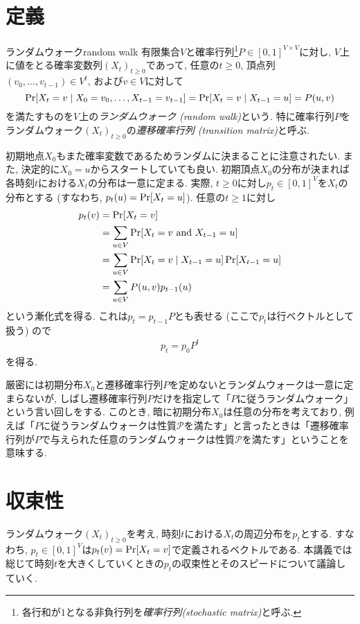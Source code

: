 \section{定義}
%
\begin{definition}{ランダムウォーク}{random walk}
  有限集合$V$と確率行列\footnote{各行和が$1$となる非負行列を\emph{確率行列(stochastic matrix)}と呼ぶ.}$P\in[0,1]^{V\times V}$に対し,
  $V$上に値をとる確率変数列$(X_t)_{t\ge 0}$であって, 任意の$t\ge 0$, 頂点列$(v_0,\dots,v_{t-1})\in V^t$,
  および$v\in V$に対して
  \[
    \Pr\sbra*{X_t = v \condition X_0 = v_0,\dots,X_{t-1} = v_{t-1}} = \Pr\sbra*{X_t = v \condition X_{t-1} = u} = P(u,v)
  \]
  を満たすものを$V$上の\emph{ランダムウォーク (random walk)}という.
  特に確率行列$P$をランダムウォーク$(X_t)_{t\ge 0}$の\emph{遷移確率行列 (transition matrix)}と呼ぶ.
\end{definition}
%
初期地点$X_0$もまた確率変数であるためランダムに決まることに注意されたい.
また, 決定的に$X_0=u$からスタートしていても良い.
%
初期頂点$X_0$の分布が決まれば各時刻$t$における$X_t$の分布は一意に定まる.
実際, $t\ge 0$に対し$p_t \in [0,1]^{V}$を$X_t$の分布とする
(すなわち, $p_t(u) = \Pr\sbra*{X_t = u}$).
任意の$t\ge 1$に対し
\begin{align*}
  p_t(v) & = \Pr\sbra*{X_t = v}                                                             \\
         & = \sum_{u\in V}\Pr\sbra*{ X_t = v \tand X_{t-1} = u}                             \\
         & = \sum_{u\in V}\Pr\sbra*{ X_t = v \condition X_{t-1} = u} \Pr\sbra*{X_{t-1} = u} \\
         & = \sum_{u\in V} P(u,v) p_{t-1}(u)
\end{align*}
という漸化式を得る.
これは$p_{t} = p_{t-1} P$とも表せる (ここで$p_t$は行ベクトルとして扱う) ので
\begin{align}
  p_t = p_0 P^t \label{eq:p_t}
\end{align}
を得る.

厳密には初期分布$X_0$と遷移確率行列$P$を定めないとランダムウォークは一意に定まらないが,
しばし遷移確率行列$P$だけを指定して「$P$に従うランダムウォーク」という言い回しをする.
このとき, 暗に初期分布$X_0$は任意の分布を考えており, 例えば「$P$に従うランダムウォークは性質$\mathcal{P}$を満たす」と言ったときは「遷移確率行列が$P$で与えられた任意のランダムウォークは性質$\mathcal{P}$を満たす」ということを意味する.

\section{収束性}
ランダムウォーク$(X_t)_{t\ge 0}$を考え, 時刻$t$における$X_t$の周辺分布を$p_t$とする.
すなわち, $p_t \in [0,1]^V$は$p_t(v) = \Pr\lbrack X_t = v\rbrack$で定義されるベクトルである.
本講義では総じて時刻$t$を大きくしていくときの$p_t$の収束性とそのスピードについて議論していく.


